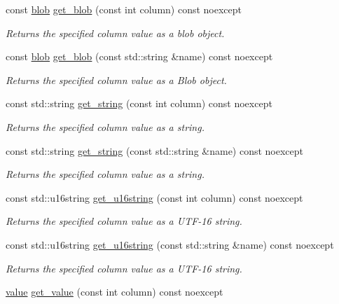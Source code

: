 \begin{DoxyCompactItemize}
const \hyperlink{a00002}{blob} \hyperlink{a00010_abd1b75c884158222778d2d6ec8b9ec18}{get\-\_\-blob} (const int column) const noexcept
\begin{DoxyCompactList}\small\item\em Returns the specified column value as a blob object. \end{DoxyCompactList}\item 
const \hyperlink{a00002}{blob} \hyperlink{a00010_a3a94b5c5a0d153ca7e2f0ef6719dfc9a}{get\-\_\-blob} (const std\-::string \&name) const noexcept
\begin{DoxyCompactList}\small\item\em Returns the specified column value as a Blob object. \end{DoxyCompactList}\item 
const std\-::string \hyperlink{a00010_a8716fe92a821ebc0799097bd6cc6d53c}{get\-\_\-string} (const int column) const noexcept
\begin{DoxyCompactList}\small\item\em Returns the specified column value as a string. \end{DoxyCompactList}\item 
const std\-::string \hyperlink{a00010_ab9c842deb81d9eb20388746672a96d29}{get\-\_\-string} (const std\-::string \&name) const noexcept
\begin{DoxyCompactList}\small\item\em Returns the specified column value as a string. \end{DoxyCompactList}\item 
const std\-::u16string \hyperlink{a00010_abfef02b657c992a2d07e28a07e41e533}{get\-\_\-u16string} (const int column) const noexcept
\begin{DoxyCompactList}\small\item\em Returns the specified column value as a U\-T\-F-\/16 string. \end{DoxyCompactList}\item 
const std\-::u16string \hyperlink{a00010_af10d3ff33e5f4ee471bc14cc41ec86c1}{get\-\_\-u16string} (const std\-::string \&name) const noexcept
\begin{DoxyCompactList}\small\item\em Returns the specified column value as a U\-T\-F-\/16 string. \end{DoxyCompactList}\item 
\hyperlink{a00015}{value} \hyperlink{a00010_af776fbdf8dc1150b628b04eca10841f4}{get\-\_\-value} (const int column) const noexcept

\end{DoxyCompactItemize}
